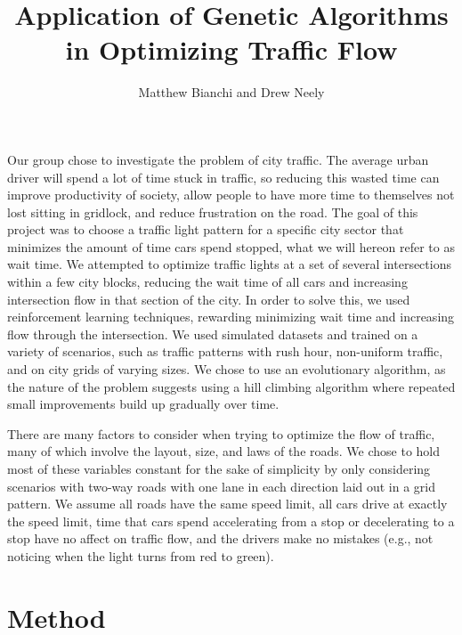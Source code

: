 \documentclass[12pt, letterpaper]{article}
\title{Application of Genetic Algorithms in Optimizing Traffic Flow}
\author{Matthew Bianchi and Drew Neely}
\begin{document}
\maketitle

Our group chose to investigate the problem of city traffic. 
The average urban driver will spend a lot of time stuck in traffic, so reducing this wasted time can improve productivity of society, allow people to have more time to themselves not lost sitting in gridlock, and reduce frustration on the road.
The goal of this project was to choose a traffic light pattern for a specific city sector that minimizes the amount of time cars spend stopped, what we will hereon refer to as wait time.
We attempted to optimize traffic lights at a set of several intersections within a few city blocks, reducing the wait time of all cars and increasing intersection flow in that section of the city. 
In order to solve this, we used reinforcement learning techniques, rewarding minimizing wait time and increasing flow through the intersection. 
We used simulated datasets and trained on a variety of scenarios, such as traffic patterns with rush hour, non-uniform traffic, and on city grids of varying sizes. 
We chose to use an evolutionary algorithm, as the nature of the problem suggests using a hill climbing algorithm where repeated small improvements build up gradually over time. 

There are many factors to consider when trying to optimize the flow of traffic, many of which involve the layout, size, and laws of the roads.
We chose to hold most of these variables constant for the sake of simplicity by only considering scenarios with two-way roads with one lane in each direction laid out in a grid pattern. 
We assume all roads have the same speed limit, all cars drive at exactly the speed limit, time that cars spend accelerating from a stop or decelerating to a stop have no affect on traffic flow, and the drivers make no mistakes (e.g., not noticing when the light turns from red to green).

\section*{Method}
\end{document}
